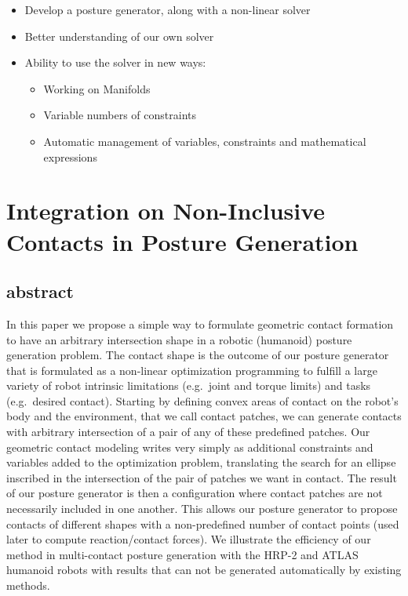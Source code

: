 \begin{itemize}
\begin{itemize}
\begin{itemize}
          \item Develop a posture generator, along with a non-linear solver
          \item Better understanding of our own solver
          \item Ability to use the solver in new ways:
          \begin{itemize}
            \item Working on Manifolds
            \item Variable numbers of constraints
            \item Automatic management of variables, constraints and mathematical expressions
          \end{itemize}
        \end{itemize}
    \end{itemize}
\end{itemize}



\section{Integration on Non-Inclusive Contacts in Posture Generation}


\subsection{abstract}
In this paper we propose a simple way to formulate geometric contact formation to have an arbitrary intersection shape in a robotic (humanoid) posture generation problem.
The contact shape is the outcome of our posture generator that is formulated as a non-linear optimization programming to fulfill a large variety of robot intrinsic limitations (e.g.\ joint and torque limits) and tasks (e.g.\ desired contact).
Starting by defining convex areas of contact on the robot's body and the environment, that we call contact patches, we can generate contacts with arbitrary intersection of a pair of any of these predefined patches.
Our geometric contact modeling writes very simply as additional constraints and variables added to the optimization problem, translating the search for an ellipse inscribed in the intersection of the pair of patches we want in contact.
The result of our posture generator is then a configuration where contact patches are not necessarily included in one another.
This allows our posture generator to propose contacts of different shapes with a non-predefined number of contact points (used later to compute reaction/contact forces).
We illustrate the efficiency of our method in multi-contact posture generation with the HRP-2 and ATLAS humanoid robots with results that can not be generated automatically by existing methods.

